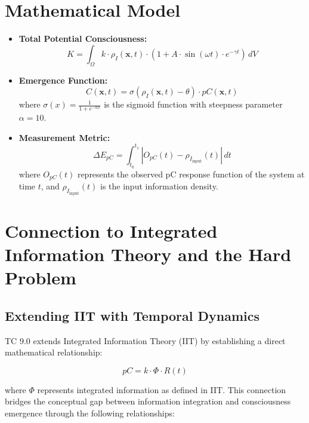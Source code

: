 \documentclass[12pt]{article}
\begin{document}
\section{Mathematical Model}
\begin{itemize}
    \item \textbf{Total Potential Consciousness:} 
    \begin{equation}
    K = \int_{\Omega} k \cdot \rho_I(\mathbf{x}, t) \cdot \left(1 + A \cdot \sin(\omega t) \cdot e^{-\gamma t}\right) \, dV
    \end{equation}
    
    \item \textbf{Emergence Function:} 
    \begin{equation}
    C(\mathbf{x}, t) = \sigma(\rho_I(\mathbf{x}, t) - \theta) \cdot pC(\mathbf{x}, t)
    \end{equation}
    where $\sigma(x) = \frac{1}{1 + e^{-\alpha x}}$ is the sigmoid function with steepness parameter $\alpha = 10$.
    
    \item \textbf{Measurement Metric:} 
    \begin{equation}
    \Delta E_{pC} = \int_{t_0}^{t_1} |O_{pC}(t) - \rho_{I_{\text{input}}}(t)| \, dt
    \end{equation}
    where $O_{pC}(t)$ represents the observed pC response function of the system at time $t$, and $\rho_{I_{\text{input}}}(t)$ is the input information density.
\end{itemize}

\section{Connection to Integrated Information Theory and the Hard Problem}

\subsection{Extending IIT with Temporal Dynamics}
TC 9.0 extends Integrated Information Theory (IIT) \cite{tononi2008,tononi2016} by establishing a direct mathematical relationship:

\begin{equation}
pC = k \cdot \Phi \cdot R(t)
\end{equation}

where $\Phi$ represents integrated information as defined in IIT. This connection bridges the conceptual gap between information integration and consciousness emergence through the following relationships:
\end{document}
